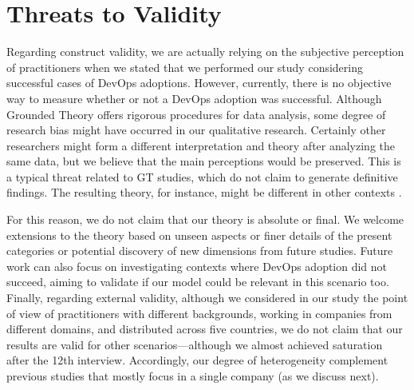 \section{Threats to Validity}

Regarding construct validity,  we are actually relying on the subjective perception of
practitioners when we stated that we performed our study considering successful cases
of DevOps adoptions. However, currently, there is no objective way to measure whether or not a
DevOps adoption was successful.
Although Grounded Theory offers rigorous procedures for data analysis, some degree of research bias
might have occurred in our qualitative research. Certainly other researchers might form a different
interpretation and theory after analyzing the same data,  but we believe that the main perceptions
would be preserved. This is a typical threat related to GT
studies, which do not claim to generate definitive findings. The resulting theory, for instance, might
be different in other contexts \cite{hoda2012developing}.

For this reason, we do not claim
that our theory is absolute or final. We welcome extensions to the theory based
on unseen aspects or finer details of the present categories or potential discovery
of new dimensions from future studies.
Future work can also focus on investigating contexts
where DevOps adoption did not succeed, aiming to validate if our model could be
relevant in this scenario too. Finally, regarding external validity, although we
considered in our study the point of view of practitioners with different
backgrounds, working in companies from different domains, and distributed across
five countries, we do not claim that our results are valid for
other scenarios---although we almost achieved saturation
after the 12th interview. Accordingly, our degree of heterogeneity complement
previous studies that mostly focus in a single company (as we discuss next).
